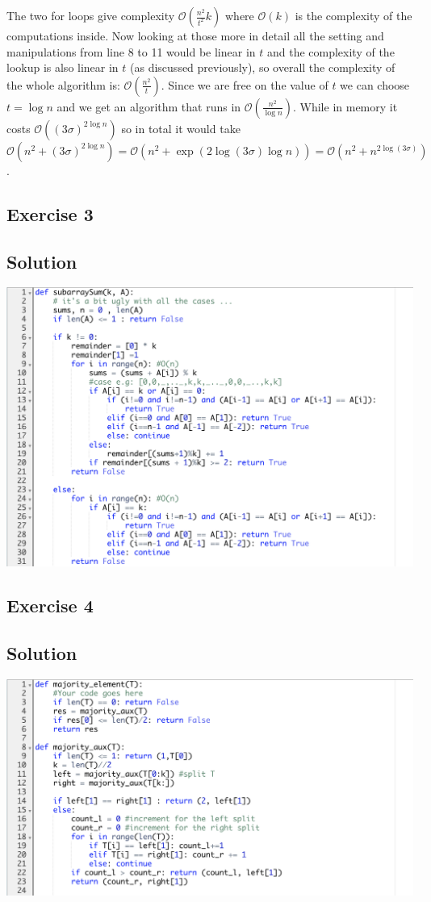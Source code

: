 \documentclass[10pt,a4paper]{article}
\begin{document}
The two for loops give complexity $\mathcal{O}(\frac{n^2}{t^2}k)$ where $\mathcal{O}(k)$ is the complexity of the computations inside. Now looking at those more in detail all the setting and manipulations from line 8 to 11 would be linear in $t$ and the complexity of the lookup is also linear in $t$ (as discussed previously), so overall the complexity of the whole algorithm is: $\mathcal{O}(\frac{n^2}{t})$. Since we are free on the value of $t$ we can choose $t = \log n$ and we get an algorithm that runs in $\mathcal{O}(\frac{n^2}{\log n})$. While in memory it costs $\mathcal{O}((3\sigma)^{2\log n})$ so in total it would take $\mathcal{O}(n^2 + (3\sigma)^{2\log n}) = \mathcal{O}(n^2 + \exp(2\log (3\sigma)\log n)) = \mathcal{O}(n^2 + n^{2\log(3\sigma)})$.

\subsection*{Exercise 3}
\subsection*{Solution}
\begin{center}
\includegraphics[width=\textwidth]{subarray}
\end{center}
\subsection*{Exercise 4}
\subsection*{Solution}
\begin{center}
\includegraphics[width=\textwidth]{majority}
\end{center}
\end{document}
